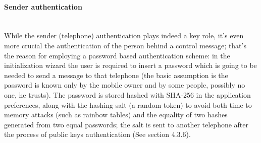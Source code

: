 \paragraph{Sender authentication} \hspace{0pt} \\
\small{While the sender (telephone) authentication plays indeed a key role, it's even more crucial the authentication of the person behind a control message; that's the reason for employing a password based authentication scheme: in the initialization wizard the user is required to insert a password which is going to be needed to send a message to that telephone (the basic assumption is the password is known only by the mobile owner and by some people, possibly no one, he trusts). The password is stored hashed with SHA-256 in the application preferences, along with the hashing salt (a random token) to avoid both time-to-memory attacks (such as rainbow tables) and the equality of two hashes generated from two equal passwords; the salt is sent to another telephone after the process of public keys authentication (See section 4.3.6).} 